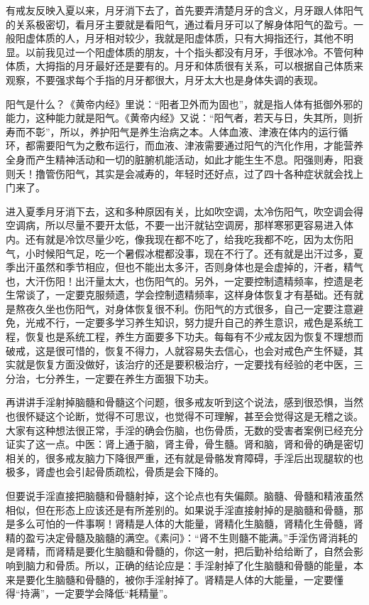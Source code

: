 有戒友反映入夏以来，月牙消下去了，首先要弄清楚月牙的含义，月牙跟人体阳气的关系极密切，看月牙主要就是看阳气，通过看月牙可以了解身体阳气的盈亏。一般阳虚体质的人，月牙相对较少，我就是阳虚体质，只有大拇指还行，其他不明显。以前我见过一个阳虚体质的朋友，十个指头都没有月牙，手很冰冷。不管何种体质，大拇指的月牙最好还是要有的。月牙和体质很有关系，可以根据自己体质来观察，不要强求每个手指的月牙都很大，月牙太大也是身体失调的表现。

阳气是什么？《黄帝内经》里说：“阳者卫外而为固也”，就是指人体有抵御外邪的能力，这种能力就是阳气。《黄帝内经》又说：“阳气者，若天与日，失其所，则折寿而不彰”，所以，养护阳气是养生治病之本。人体血液、津液在体内的运行循环，都需要阳气为之敷布运行，而血液、津液需要通过阳气的汽化作用，才能营养全身而产生精神活动和一切的脏腑机能活动，如此才能生生不息。阳强则寿，阳衰则夭！撸管伤阳气，其实是会减寿的，年轻时还好点，过了四十各种症状就会找上门来了。

进入夏季月牙消下去，这和多种原因有关，比如吹空调，太冷伤阳气，吹空调会得空调病，所以尽量不要开太低，不要一出汗就钻空调房，那样寒邪更容易进入体内。还有就是冷饮尽量少吃，像我现在都不吃了，给我吃我都不吃，因为太伤阳气，小时候阳气足，吃一个暑假冰棍都没事，现在不行了。还有就是出汗过多，夏季出汗虽然和季节相应，但也不能出太多汗，否则身体也是会虚掉的，汗者，精气也，大汗伤阳！出汗量太大，也伤阳气的。另外，一定要控制遗精频率，控遗是老生常谈了，一定要克服频遗，学会控制遗精频率，这样身体恢复才有基础。还有就是熬夜久坐也伤阳气，对身体恢复很不利。伤阳气的方式很多，自己一定要注意避免，光戒不行，一定要多学习养生知识，努力提升自己的养生意识，戒色是系统工程，恢复也是系统工程，养生方面要多下功夫。每每有不少戒友因为恢复不理想而破戒，这是很可惜的，恢复不得力，人就容易失去信心，也会对戒色产生怀疑，其实就是恢复方面没做好，该治疗的还是要积极治疗，一定要找有经验的老中医，三分治，七分养生，一定要在养生方面狠下功夫。

再讲讲手淫射掉脑髓和骨髓这个问题，很多戒友听到这个说法，感到很恐惧，当然也很怀疑这个论断，觉得不可思议，也觉得不可理解，甚至会觉得这是无稽之谈。大家有这种想法很正常，手淫的确会伤脑，也伤骨质，无数的受害者案例已经充分证实了这一点。中医：肾上通于脑，肾主骨，骨生髓。肾和脑，肾和骨的确是密切相关的，很多戒友脑力下降很严重，还有就是骨骼发育障碍，手淫后出现腿软的也极多，肾虚也会引起骨质疏松，骨质是会下降的。

但要说手淫直接把脑髓和骨髓射掉，这个论点也有失偏颇。脑髓、骨髓和精液虽然相似，但在形态上应该还是有所差别的。如果说手淫直接射掉的是脑髓和骨髓，那是多么可怕的一件事啊！肾精是人体的大能量，肾精化生脑髓，肾精化生骨髓，肾精的盈亏决定骨髓及脑髓的满空。《素问》：“肾不生则髓不能满。”手淫伤肾消耗的是肾精，而肾精是要化生脑髓和骨髓的，你这一射，把后勤补给给断了，自然会影响到脑力和骨质。所以，正确的结论应是：手淫射掉了化生脑髓和骨髓的能量，本来是要化生脑髓和骨髓的，被你手淫射掉了。肾精是人体的大能量，一定要懂得“持满”，一定要学会降低“耗精量”。

